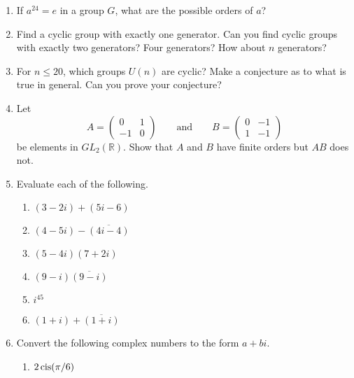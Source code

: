 {\begin{enumerate}
\item
If $a^{24} =e$ in a group $G$, what are the possible orders of $a$? 
 
 
\item
Find a cyclic group with exactly one generator.  Can you find cyclic
groups with exactly two generators?  Four generators?  How about $n$
generators?
 
 
\item
For $n \leq 20$, which groups $U(n)$ are cyclic?  Make a conjecture as
to what is true in general.  Can you prove your conjecture?  
 
 
\item
Let
\[
A=
\begin{pmatrix}
0 & 1 \\
-1 & 0
\end{pmatrix}
\qquad \text{and} \qquad
B=
\begin{pmatrix}
0 & -1 \\
1 & -1
\end{pmatrix}
\]
be elements in $GL_2( {\mathbb R} )$. Show that $A$ and $B$ have finite
orders but $AB$ does not. 
 
 
\item
Evaluate each of the following.
\begin{multicols}{2}
\begin{enumerate}
 
\item
$(3-2i)+ (5i-6)$

 
\item
 $(4-5i)-\overline{(4i -4)}$
 
 \item
$(5-4i)(7+2i)$
 
\item
$(9-i) \overline{(9-i)}$
 
 \item
$i^{45}$

\item
$(1+i)+\overline{(1+i)}$
 
\end{enumerate}
\end{multicols}
 
 
 \item   %
Convert the following complex numbers to the form $a + bi$.
\begin{multicols}{2}
\begin{enumerate}

 \item
$2 \operatorname{cis}(\pi / 6 )$


\end{enumerate}
\end{multicols}
\end{enumerate}}
